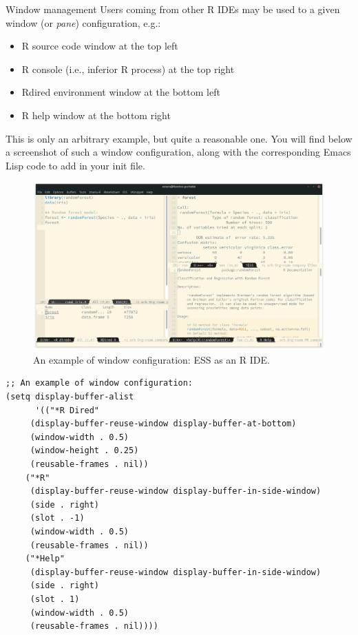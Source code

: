 \documentclass[presentation]{beamer}
\begin{document}
\begin{frame}[fragile,allowframebreaks,label=]{Window management}
 Users coming from other R IDEs may be used to a given window (or \emph{pane}) configuration, e.g.:
\begin{itemize}
\item R source code window at the top left
\item R console (i.e., inferior R process) at the top right
\item Rdired environment window at the bottom left
\item R help window at the bottom right
\end{itemize}

This is only an arbitrary example, but quite a reasonable one. You will find below a screenshot of such a window configuration, along with the corresponding Emacs Lisp code to add in your init file.

\pagebreak

\begin{figure}[htbp]
\centering
\includegraphics[width=0.96 \textwidth]{./images/window_config.png}
\caption{\label{fig:orgfa5ff4c}An example of window configuration: ESS as an R IDE.}
\end{figure}

\pagebreak

\begin{verbatim}
;; An example of window configuration:
(setq display-buffer-alist
      '(("*R Dired"
	 (display-buffer-reuse-window display-buffer-at-bottom)
	 (window-width . 0.5)
	 (window-height . 0.25)
	 (reusable-frames . nil))
	("*R"
	 (display-buffer-reuse-window display-buffer-in-side-window)
	 (side . right)
	 (slot . -1)
	 (window-width . 0.5)
	 (reusable-frames . nil))
	("*Help"
	 (display-buffer-reuse-window display-buffer-in-side-window)
	 (side . right)
	 (slot . 1)
	 (window-width . 0.5)
	 (reusable-frames . nil))))
\end{verbatim}
\end{frame}
\end{document}
